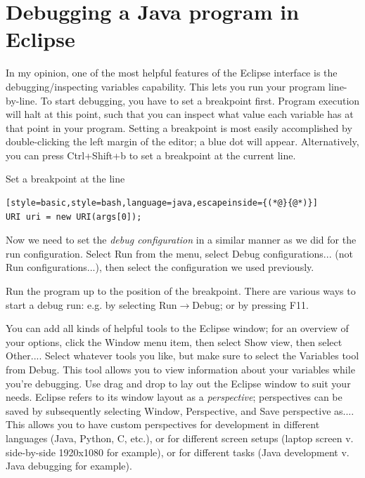 \documentclass[12pt, a4paper, twoside, openany, titlepage]{book}
\begin{document}
\section{Debugging a Java program in Eclipse}




In my opinion, one of the most helpful features of the Eclipse interface is the debugging/inspecting variables capability. This lets you run your program line-by-line. To start debugging, you have to set a breakpoint first. Program execution will halt at this point, such that you can inspect what value each variable has at that point in your program. Setting a breakpoint is most easily accomplished by double-clicking the left margin of the editor; a blue dot will appear. Alternatively, you can press \textsf{Ctrl+Shift+b} to set a breakpoint at the current line.

Set a breakpoint at the line
\begin{lstlisting}[style=basic,style=bash,language=java,escapeinside={(*@}{@*)}]
URI uri = new URI(args[0]);
\end{lstlisting}

Now we need to set the \textit{debug configuration} in a similar manner as we did for the run configuration. Select \textsf{Run} from the menu, select \textsf{Debug configurations...} (not \textsf{Run configurations...}), then select the configuration we used previously.

Run the program up to the position of the breakpoint. There are various ways to start a debug run: e.g. by selecting \textsf{Run}$\rightarrow$\textsf{Debug}; or by pressing \textsf{F11}.

You can add all kinds of helpful tools to the Eclipse window; for an overview of your options, click the \textsf{Window} menu item, then select \textsf{Show view}, then select \textsf{Other...}. Select whatever tools you like, but make sure to select the \textsf{Variables} tool from \textsf{Debug}. This tool allows you to view information about your variables while you're debugging. Use drag and drop to lay out the Eclipse window to suit your needs. Eclipse refers to its window layout as a \textit{perspective}; perspectives can be saved by subsequently selecting \textsf{Window}, \textsf{Perspective}, and \textsf{Save perspective as...}. This allows you to have custom perspectives for development in different languages (Java, Python, C, etc.), or for different screen setups (laptop screen v. side-by-side 1920x1080 for example), or for different tasks (Java development v. Java debugging for example).
\end{document}

